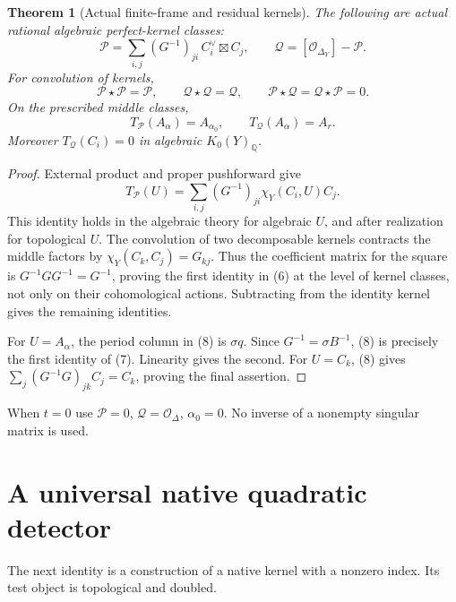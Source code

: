 \documentclass[11pt]{article}
\newcommand{\Q}{\mathbb Q}
\newtheorem{theorem}{Theorem}
\begin{document}
\begin{theorem}[Actual finite-frame and residual kernels]
The following are actual rational algebraic perfect-kernel classes:
\[
 \mathscr P=\sum_{i,j}(G^{-1})_{ji}\,C_i^\vee\boxtimes C_j,
 \qquad
 \boxed{\mathscr Q=[\mathcal O_{\Delta_Y}]-\mathscr P.} \tag{5}
\]
For convolution of kernels,
\[
 \mathscr P\star\mathscr P=\mathscr P,\qquad
 \mathscr Q\star\mathscr Q=\mathscr Q,\qquad
 \mathscr P\star\mathscr Q=\mathscr Q\star\mathscr P=0. \tag{6}
\]
On the prescribed middle classes,
\[
 T_{\mathscr P}(A_\alpha)=A_{\alpha_0},\qquad
 \boxed{T_{\mathscr Q}(A_\alpha)=A_r.}                \tag{7}
\]
Moreover $T_{\mathscr Q}(C_i)=0$ in algebraic $K_0(Y)_\Q$.
\end{theorem}
\begin{proof}
External product and proper pushforward give
\[
 T_{\mathscr P}(U)
 =\sum_{i,j}(G^{-1})_{ji}\chi_Y(C_i,U)C_j.             \tag{8}
\]
This identity holds in the algebraic theory for algebraic $U$,
and after realization for topological $U$.
The convolution of two decomposable kernels contracts the middle
factors by $\chi_Y(C_k,C_j)=G_{kj}$. Thus the coefficient matrix
for the square is $G^{-1}GG^{-1}=G^{-1}$, proving the first
identity in (6) at the level of kernel classes, not only on
their cohomological actions. Subtracting from the identity kernel
gives the remaining identities.

For $U=A_\alpha$, the period column in (8) is $\sigma q$.
Since $G^{-1}=\sigma B^{-1}$, (8) is precisely the first
identity of (7). Linearity gives the second.
For $U=C_k$, (8) gives
$\sum_j(G^{-1}G)_{jk}C_j=C_k$, proving the final assertion.
\end{proof}
When $t=0$ use $\mathscr P=0$, $\mathscr Q=\mathcal O_\Delta$,
$\alpha_0=0$. No inverse of a nonempty singular matrix is used.

\section{A universal native quadratic detector}
The next identity is a construction of a native kernel with a
nonzero index. Its test object is topological and doubled.
\end{document}
